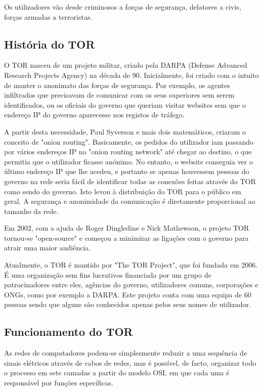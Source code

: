 \documentclass{llncs}
\begin{document}
Os utilizadores vão desde criminosos a forças de segurança, delatores a civis, forças armadas a terroristas. 

\subsection{História do TOR}
\hspace{3mm} O TOR nasceu de um projeto militar, criado pela DARPA (Defense Advanced Research Projects Agency) na década de 90. Inicialmente, foi criado com o intuito de manter o anonimato das forças de segurança. Por exemplo, os agentes infiltrados que precisavam de comunicar com os seus superiores sem serem identificados, ou os oficiais do governo que queriam visitar websites sem que o endereço IP do governo aparecesse nos registos de tráfego. 

\par A partir desta necessidade, Paul Syverson e mais dois matemáticos, criaram o conceito de "onion routing". Basicamente, os pedidos do utilizador iam passando por vários endereços IP na "onion routing network" até chegar ao destino, o que permitia que o utilizador ficasse anónimo. No entanto, o website conseguia ver o último endereço IP que lhe acedeu, e portanto se apenas houvessem pessoas do governo na rede seria fácil de identificar todas as conexões feitas através do TOR como sendo do governo. Isto levou à distribuição do TOR para o público em geral. A segurança e anonimidade da comunicação é diretamente proporcional ao tamanho da rede.

\par Em 2002, com a ajuda de Roger Dingledine e Nick Mathewson, o projeto TOR tornou-se "open-source" e começou a minimizar as ligações com o governo para atrair uma maior audiência.

\par Atualmente, o TOR é mantido por "The TOR Project", que foi fundada em 2006. É uma organização sem fins lucrativos financiada por um grupo de patrocinadores entre eles, agências do governo, utilizadores comuns, corporações e ONGs, como por exemplo a DARPA. Este projeto conta com uma equipa de 60 pessoas sendo que alguns são conhecidos apenas pelos seus nomes de utilizador. \cite{Corianna}

\subsection{Funcionamento do TOR}

\hspace{3mm} As redes de computadores podem-se simplesmente reduzir a uma sequência de sinais elétricos através de cabos de redes, mas é possível, de facto, organizar todo o processo em sete camadas a partir do modelo OSI, em que cada uma é responsável por funções específicas.
\end{document}
